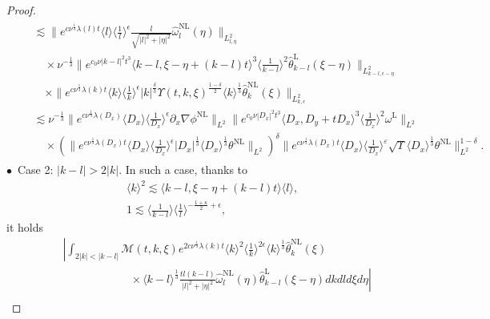 \documentclass[reqno, 12pt]{amsart} %
\theoremstyle{plain} %
\theoremstyle{definition}
\theoremstyle{remark}
\numberwithin{equation}{section} %
\newcommand{\lt}{\left}
\newcommand{\rt}{\right}
\begin{document}
\begin{proof}
$$\begin{aligned}
			& \begin{aligned}
				& \lesssim\|e^{c \nu^{\frac{1}{3}} \lambda(l) t}\langle l\rangle\langle\frac{1}{l}\rangle^\epsilon \frac{l}{\sqrt{|l|^2+|\eta|^2}} \hat{\omega}_l^{\mathrm{NL}}(\eta)\|_{L_{l, \eta}^2} \\
				&\quad \times \nu^{-\frac{1}{3}}\|e^{c_0 \nu|k-l|^2 t^3}\langle k-l, \xi-\eta+(k-l) t\rangle^3\langle\frac{1}{k-l}\rangle^2    \hat{\theta}_{k-l}^{\mathrm{L}}(\xi-\eta)\|_{L_{k-l, \epsilon-\eta}^2} \\
				& \quad \times\|e^{c \nu^{\frac{1}{3}} \lambda(k) t}\langle k\rangle\langle\frac{1}{k}\rangle^\epsilon|k|^{\frac{\delta}{3}} \Upsilon(t, k, \xi)^{\frac{1-\delta}{2}} \langle k \rangle^\frac13 \hat{\theta}_k^{\mathrm{NL}}(\xi)\|_{L_{k, \epsilon}^2} \\
				& \lesssim \nu^{-\frac{1}{3} }\|e^{c \nu^{\frac{1}{3}} \lambda\left(D_x\right)}\langle D_x\rangle\langle\frac{1}{D_x}\rangle^\epsilon \partial_x \nabla \phi^{\mathrm{NL}}\|_{L^2}\|e^{c_0 \nu\left|D_x\right|^2 t^3}\langle D_x, D_y+t D_x\rangle^3\langle\frac{1}{D_x}\rangle^2 \omega^{\mathrm{L}}\|_{L^2} \\
				& \quad \times\left( \|e^{c \nu^{\frac{1}{3}} \lambda\left(D_x\right) t}\langle D_x\rangle\langle\frac{1}{D_x}\rangle^\epsilon\left|D_x\right|^{\frac{1}{3}}\langle D_x \rangle^\frac{1}{3} \theta^{\mathrm{NL}}\|_{L^2}\right)^\delta \| e^{c \nu^\frac13 \lambda\left(D_x\right) t} 
				\langle D_x\rangle\langle\frac{1}{D_x}\rangle^{\varepsilon} \sqrt{\Upsilon } \langle D_x \rangle^\frac13 \theta^{\mathrm{NL}} \|_{L^2}^{1-\delta} .
			\end{aligned}
		\end{aligned}
		$$
		$\bullet$~Case 2:   $|k-l| > 2|k|$. In such a case, thanks to 
		\begin{align}
			&\langle k \rangle^2 \lesssim \langle k-l, \xi-\eta+(k-l) t\rangle \langle l \rangle , \label{eq:trick7}\\
			& 1 \lesssim \langle \frac{1}{k-l} \rangle \langle \frac1l \rangle^{-\frac{1+ \kappa}{2} + \epsilon},  \label{eq:trick8}
		\end{align}
		it holds 
		\begin{eqnarray*}
			&& \left|\int_{2|k|<|k-l|}\mathcal{M}(t, k, \xi) e^{2 c \nu^{\frac{1}{3}} \lambda(k) t}\langle k\rangle^2\langle\frac{1}{k}\rangle^{2 \epsilon} \langle k \rangle^\frac13\hat{\theta}_k^{\mathrm{NL}}(\xi)\rt.\\
			&&\lt. \qquad\qquad  \qquad \times  \langle k-l \rangle^\frac13  \frac{t l(k-l)}{|l|^2+|\eta|^2} \hat{\omega}_l^{\mathrm{NL}}(\eta) \hat{\theta}_{k-l}^{\mathrm{L}}(\xi-\eta) d k d l d \xi d \eta\right| \\

\end{eqnarray*}
\end{proof}
\end{document}
